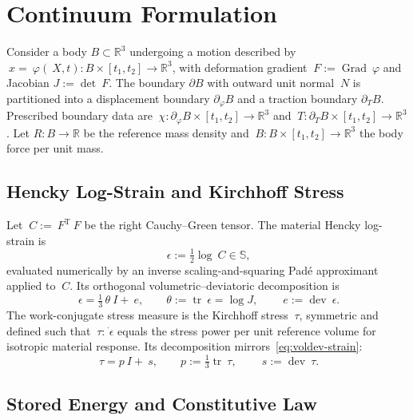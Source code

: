 \documentclass[12pt]{article}
\newcommand{\F}{~F}
\newcommand{\C}{~C}
\newcommand{\eps}{~\epsilon}
\newcommand{\edev}{~e}
\newcommand{\btau}{~\tau}
\newcommand{\sdev}{~s}
\newcommand{\Reals}{\mathbb{R}}
\newcommand{\Syms}{\mathbb{S}}
\DeclareMathOperator{\trace}{tr}
\DeclareMathOperator{\dev}{dev}
\DeclareMathOperator{\Grad}{Grad}
\newcommand{\transpose}[1]{{#1}^{\mathrm{T}}}
\begin{document}
\section{Continuum Formulation}
\label{sec:continuum}

Consider a body $B \subset \Reals^3$ undergoing a motion described
by $~x = ~\varphi(~X, t): B \times [t_1, t_2] \rightarrow \Reals^3$,
with deformation gradient $\F := \Grad ~\varphi$ and Jacobian
$J := \det \F$. The boundary $\partial B$ with outward unit normal
$~N$ is partitioned into a displacement boundary
$\partial_\varphi B$ and a traction boundary $\partial_T B$.
Prescribed boundary data are
$~\chi : \partial_\varphi B \times [t_1, t_2] \rightarrow \Reals^3$
and $~T : \partial_T B \times [t_1, t_2] \rightarrow \Reals^3$.
Let $R : B \rightarrow \Reals$ be the reference mass density and
$~B : B \times [t_1, t_2] \rightarrow \Reals^3$ the body force per
unit mass.

\subsection{Hencky Log-Strain and Kirchhoff Stress}
\label{sec:hencky}

Let $\C := \transpose{\F}\F$ be the right Cauchy--Green tensor. The
material Hencky log-strain is
\begin{equation}
  \label{eq:hencky}
  \eps := \tfrac{1}{2} \log \C \in \Syms,
\end{equation}
evaluated numerically by an inverse scaling-and-squaring Pad\'e
approximant applied to $\C$. Its orthogonal
volumetric--deviatoric decomposition is
\begin{equation}
  \label{eq:voldev-strain}
  \eps = \tfrac{1}{3}\,\theta~I + \edev,
  \qquad
  \theta := \trace \eps = \log J,
  \qquad
  \edev := \dev \eps.
\end{equation}
The work-conjugate stress measure is the Kirchhoff stress
$\btau$, symmetric and defined such that $\btau : \dot{\eps}$ equals the
stress power per unit reference volume for isotropic material
response. Its decomposition mirrors~\eqref{eq:voldev-strain}:
\begin{equation}
  \label{eq:voldev-stress}
  \btau = p~I + \sdev,
  \qquad
  p := \tfrac{1}{3} \trace \btau,
  \qquad
  \sdev := \dev \btau.
\end{equation}

\subsection{Stored Energy and Constitutive Law}
\label{sec:stored-energy}
\end{document}
